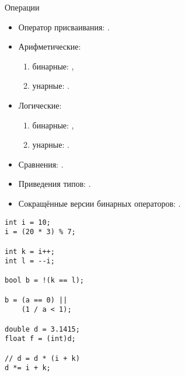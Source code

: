 \documentclass{beamer}
\begin{document}
\begin{frame}[fragile]{Операции}
\begin{minipage}{.59\textwidth}
    \begin{itemize}
        \item Оператор присваивания: \code{=}.
        \item Арифметические:
        \begin{enumerate}
            \item бинарные: \code{+ - * / \%},
            \item унарные:  \code{++ {-}{-}}.
        \end{enumerate}
        \item Логические:
        \begin{enumerate}
            \item бинарные:  \code{\&\& ||},
            \item унарные:   \code{!}. 
        \end{enumerate}
        \item Сравнения: \code{== != > < >= <=}.
        \item Приведения типов: .
        \item Сокращённые версии бинарных операторов:
            \code{+= -= *= /= \%=}.
    \end{itemize}
\end{minipage}\hfill
\begin{minipage}{.4\textwidth}
\begin{lstlisting}
int i = 10;
i = (20 * 3) % 7;

int k = i++;
int l = --i;

bool b = !(k == l);

b = (a == 0) ||
    (1 / a < 1); 

double d = 3.1415;
float f = (int)d;

// d = d * (i + k)
d *= i + k;
\end{lstlisting}
\end{minipage}
\end{frame}
\end{document}
